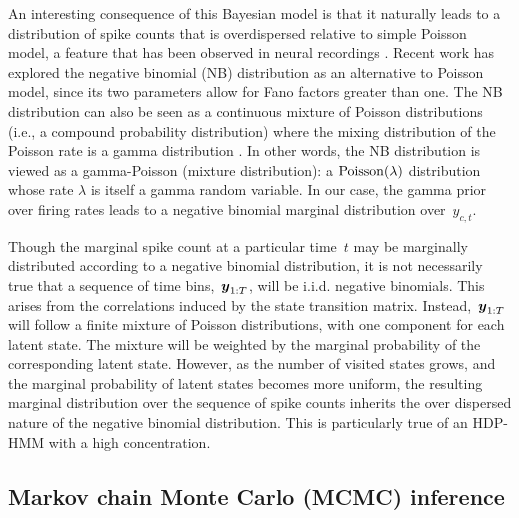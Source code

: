 An interesting consequence of this Bayesian model is that it naturally
leads to a distribution of spike counts that is overdispersed relative
to simple Poisson model, a feature that has been observed in neural
recordings \citep{Goris14}. Recent work has explored the negative
binomial (NB) distribution as an alternative to Poisson model, since
its two parameters allow for Fano factors greater than one.  The NB
distribution can also be seen as a continuous mixture of Poisson
distributions (i.e., a compound probability distribution) where the
mixing distribution of the Poisson rate is a gamma distribution
\citep{Gelman13}. In other words, the NB distribution is viewed as a
gamma-Poisson (mixture distribution): a $\mathrm{Poisson}(\lambda)$
distribution whose rate $\lambda$ is itself a gamma random
variable. In our case, the gamma prior over firing rates leads to a
negative binomial marginal distribution over~$y_{c,t}$.

Though the marginal spike count at a particular time~$t$ may be
marginally distributed according to a negative binomial distribution,
it is not necessarily true that a sequence of time bins,~$\boldsymbol{y}_{1:T}$,
will be i.i.d. negative binomials. This arises from the correlations
induced by the state transition matrix. Instead,~$\boldsymbol{y}_{1:T}$ will
follow a finite mixture of Poisson distributions, with one component
for each latent state. The mixture will be weighted by the marginal
probability of the corresponding latent state. However, as the number
of visited states grows, and the marginal probability of latent states
becomes more uniform, the resulting marginal distribution over the
sequence of spike counts inherits the over dispersed nature of the
negative binomial distribution. This is particularly true of an
HDP-HMM with a high concentration.

 \subsection{Markov chain Monte Carlo (MCMC) inference}


